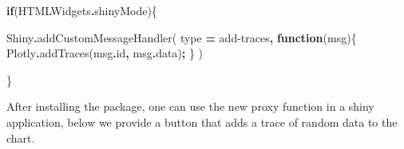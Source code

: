 \documentclass[
]{krantz}
\makeatletter
\newenvironment{Shaded}{\begin{snugshade}}{\end{snugshade}}
\newcommand{\AttributeTok}[1]{\textcolor[rgb]{0.61,0.61,0.61}{#1}}
\newcommand{\ControlFlowTok}[1]{\textcolor[rgb]{0.27,0.27,0.27}{\textbf{#1}}}
\newcommand{\FunctionTok}[1]{\textcolor[rgb]{0,0,0}{#1}}
\newcommand{\KeywordTok}[1]{\textcolor[rgb]{0.27,0.27,0.27}{\textbf{#1}}}
\newcommand{\NormalTok}[1]{#1}
\newcommand{\OperatorTok}[1]{\textcolor[rgb]{0.43,0.43,0.43}{\textbf{#1}}}
\newcommand{\StringTok}[1]{\textcolor[rgb]{0.5,0.5,0.5}{#1}}
\newenvironment{kframe}{%
\medskip{}
\setlength{\fboxsep}{.8em}
 \def\at@end@of@kframe{}%
 \ifinner\ifhmode%
  \def\at@end@of@kframe{\end{minipage}}%
  \begin{minipage}{\columnwidth}%
 \fi\fi%
 \def\FrameCommand##1{\hskip\@totalleftmargin \hskip-\fboxsep
 \colorbox{shadecolor}{##1}\hskip-\fboxsep
     \hskip-\linewidth \hskip-\@totalleftmargin \hskip\columnwidth}%
 \MakeFramed {\advance\hsize-\width
   \@totalleftmargin\z@ \linewidth\hsize
   \@setminipage}}%
 {\par\unskip\endMakeFramed%
 \at@end@of@kframe}
\renewenvironment{Shaded}{\begin{kframe}}{\end{kframe}}
\makeatother
\begin{document}
\begin{Shaded}
\begin{Highlighting}[]
\ControlFlowTok{if}\NormalTok{(HTMLWidgets}\OperatorTok{.}\AttributeTok{shinyMode}\NormalTok{)\{}

\NormalTok{  Shiny}\OperatorTok{.}\FunctionTok{addCustomMessageHandler}\NormalTok{(}
\NormalTok{    type }\OperatorTok{=} \StringTok{\textquotesingle{}add{-}traces\textquotesingle{}}\OperatorTok{,} \KeywordTok{function}\NormalTok{(msg)\{}
\NormalTok{      Plotly}\OperatorTok{.}\FunctionTok{addTraces}\NormalTok{(msg}\OperatorTok{.}\AttributeTok{id}\OperatorTok{,}\NormalTok{ msg}\OperatorTok{.}\AttributeTok{data}\NormalTok{)}\OperatorTok{;}
\NormalTok{    \}}
\NormalTok{  )}

\NormalTok{\}}
\end{Highlighting}
\end{Shaded}

After installing the package, one can use the new proxy function in a shiny application, below we provide a button that adds a trace of random data to the chart.
\end{document}
